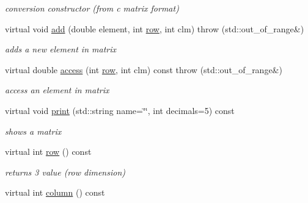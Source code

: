 \begin{DoxyCompactItemize}
\begin{DoxyCompactList}\small\item\em conversion constructor (from c matrix format) \end{DoxyCompactList}\item 
virtual void \hyperlink{classavr_matrix3x4_a4e47d85232a5abe1ccc8cd0ba72e4e18}{add} (double element, int \hyperlink{classavr_matrix3x4_a465a111b0339bd80a8c19418775da47f}{row}, int clm)  throw (std\-::out\-\_\-of\-\_\-range\&)
\begin{DoxyCompactList}\small\item\em adds a new element in matrix \end{DoxyCompactList}\item 
virtual double \hyperlink{classavr_matrix3x4_a7782b5c0211411a41e5293b038974ff1}{access} (int \hyperlink{classavr_matrix3x4_a465a111b0339bd80a8c19418775da47f}{row}, int clm) const   throw (std\-::out\-\_\-of\-\_\-range\&)
\begin{DoxyCompactList}\small\item\em access an element in matrix \end{DoxyCompactList}\item 
virtual void \hyperlink{classavr_matrix3x4_a5a420d32fd603ba922472c5777dbc4cb}{print} (std\-::string name=\char`\"{}\char`\"{}, int decimals=5) const 
\begin{DoxyCompactList}\small\item\em shows a matrix \end{DoxyCompactList}\item 
\hypertarget{classavr_matrix3x4_a465a111b0339bd80a8c19418775da47f}{virtual int \hyperlink{classavr_matrix3x4_a465a111b0339bd80a8c19418775da47f}{row} () const }\label{classavr_matrix3x4_a465a111b0339bd80a8c19418775da47f}

\begin{DoxyCompactList}\small\item\em returns 3 value (row dimension) \end{DoxyCompactList}\item 
\hypertarget{classavr_matrix3x4_ad5a7117cf1ded88dfb8dd01cb12aa6e9}{virtual int \hyperlink{classavr_matrix3x4_ad5a7117cf1ded88dfb8dd01cb12aa6e9}{column} () const }\label{classavr_matrix3x4_ad5a7117cf1ded88dfb8dd01cb12aa6e9}


\end{DoxyCompactItemize}
